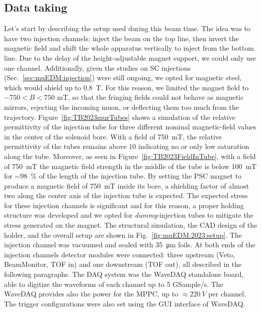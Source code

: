 \begin{refsection}
    \subsection{Data taking}
        Let's start by describing the setup used during this beam time.
        The idea was to have two injection channels: inject the beam on the top line, then invert the magnetic field and shift the whole apparatus vertically to inject from the bottom line.
        Due to the delay of the height-adjustable magnet support, we could only use one channel.
        Additionally, given the studies on SC injections (Sec.~\ref{sec:muEDM:injection}) were still ongoing, we opted for magnetic steel, which would shield up to \SI{0.8}{T}. 
        For this reason, we limited the magnet field to $-750<B<750$ mT, so that the fringing fields could not behave as magnetic mirrors, rejecting the incoming muon, or deflecting them too much from the trajectory.
        Figure~\ref{fig:TB2023murTubes} shows a simulation of the relative permittivity of the injection tube for three different nominal magnetic-field values in the center of the solenoid bore. With a field of \SI{750}{\milli\tesla}, the relative permittivity of the tubes remains above 10 indicating no or only low saturation along the tube. Moreover, as seen in Figure~\ref{fig:TB2023FieldInTube}, with a field of \SI{750}{\milli\tesla} the magnetic field strength in the middle of the tube is below \SI{100}{\milli\tesla} for $\sim$\SI{98}{\%} of the length of the injection tube. 
        By setting the PSC magnet to produce a magnetic field of \SI{750}{\milli\tesla} inside its bore, a shielding factor of almost two along the center axis of the injection tube is expected.
        The expected stress for these injection channels is significant and for this reason, a proper holding structure was developed and we opted for \textit{dummy}-injection tubes to mitigate the stress generated on the magnet.
        The \ansys structural simulation, the CAD design of the holder, and the overall setup are shown in Fig.~\ref{fig:muEDM:2023:setup}.
        The injection channel was vacuumed and sealed with \SI{35}{\micro\meter} \mylar foils.
        At both ends of the injection channels detector modules were connected: three upstream (Veto, BeamMonitor, TOF in) and one downstream (TOF out), all described in the following paragraphs.
        The DAQ system was the WaveDAQ standalone board, able to digitize the waveforms of each channel up to 5 GSample/s. 
        The WaveDAQ provides also the power for the MPPC, up to $\approx\SI{220}{V}$ per channel. 
        The trigger configurations were also set using the GUI interface of WaveDAQ. 


\end{refsection}
